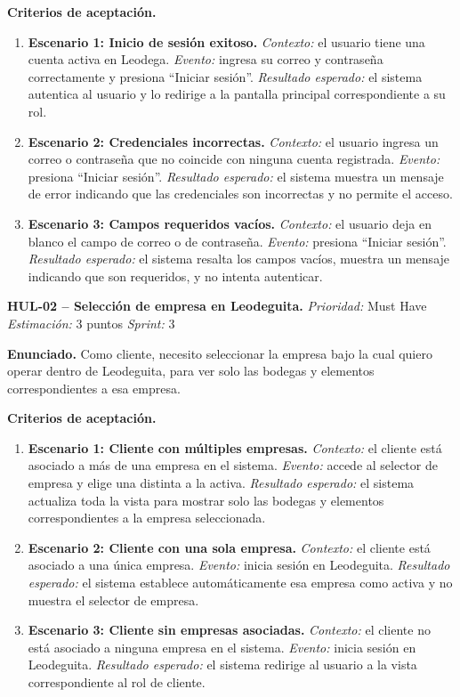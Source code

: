 \textbf{Criterios de aceptación.}
\begin{enumerate}
\item \textbf{Escenario 1: Inicio de sesión exitoso.} \textit{Contexto:} el usuario tiene una cuenta activa en Leodega. \textit{Evento:} ingresa su correo y contraseña correctamente y presiona ``Iniciar sesión''. \textit{Resultado esperado:} el sistema autentica al usuario y lo redirige a la pantalla principal correspondiente a su rol.
\item \textbf{Escenario 2: Credenciales incorrectas.} \textit{Contexto:} el usuario ingresa un correo o contraseña que no coincide con ninguna cuenta registrada. \textit{Evento:} presiona ``Iniciar sesión''. \textit{Resultado esperado:} el sistema muestra un mensaje de error indicando que las credenciales son incorrectas y no permite el acceso.
\item \textbf{Escenario 3: Campos requeridos vacíos.} \textit{Contexto:} el usuario deja en blanco el campo de correo o de contraseña. \textit{Evento:} presiona ``Iniciar sesión''. \textit{Resultado esperado:} el sistema resalta los campos vacíos, muestra un mensaje indicando que son requeridos, y no intenta autenticar.
\end{enumerate}

\textbf{HUL-02 -- Selección de empresa en Leodeguita.} \label{req:HUL-02}
\textit{Prioridad:} Must Have \quad \textit{Estimación:} 3 puntos \quad \textit{Sprint:} 3

\textbf{Enunciado.} Como cliente, necesito seleccionar la empresa bajo la cual quiero operar dentro de Leodeguita, para ver solo las bodegas y elementos correspondientes a esa empresa.

\textbf{Criterios de aceptación.}
\begin{enumerate}
\item \textbf{Escenario 1: Cliente con múltiples empresas.} \textit{Contexto:} el cliente está asociado a más de una empresa en el sistema. \textit{Evento:} accede al selector de empresa y elige una distinta a la activa. \textit{Resultado esperado:} el sistema actualiza toda la vista para mostrar solo las bodegas y elementos correspondientes a la empresa seleccionada.
\item \textbf{Escenario 2: Cliente con una sola empresa.} \textit{Contexto:} el cliente está asociado a una única empresa. \textit{Evento:} inicia sesión en Leodeguita. \textit{Resultado esperado:} el sistema establece automáticamente esa empresa como activa y no muestra el selector de empresa.
\item \textbf{Escenario 3: Cliente sin empresas asociadas.} \textit{Contexto:} el cliente no está asociado a ninguna empresa en el sistema. \textit{Evento:} inicia sesión en Leodeguita. \textit{Resultado esperado:} el sistema redirige al usuario a la vista correspondiente al rol de cliente.
\end{enumerate}

